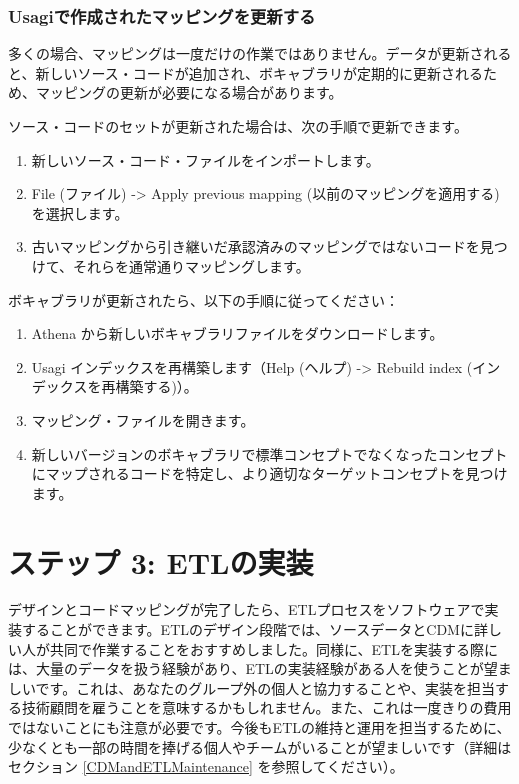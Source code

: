 \documentclass[
  11pt]{book}
\providecommand{\tightlist}{%
  \setlength{\itemsep}{0pt}\setlength{\parskip}{0pt}}
\theoremstyle{definition}
\theoremstyle{definition}
\theoremstyle{definition}
\theoremstyle{definition}
\theoremstyle{remark}
\begin{document}
\subsubsection*{Usagiで作成されたマッピングを更新する}\label{usagiux3067ux4f5cux6210ux3055ux308cux305fux30deux30c3ux30d4ux30f3ux30b0ux3092ux66f4ux65b0ux3059ux308b}

多くの場合、マッピングは一度だけの作業ではありません。データが更新されると、新しいソース・コードが追加され、ボキャブラリが定期的に更新されるため、マッピングの更新が必要になる場合があります。

ソース・コードのセットが更新された場合は、次の手順で更新できます。

\begin{enumerate}
\def\labelenumi{\arabic{enumi}.}
\tightlist
\item
  新しいソース・コード・ファイルをインポートします。
\item
  File (ファイル) -\textgreater{} Apply previous mapping (以前のマッピングを適用する) を選択します。
\item
  古いマッピングから引き継いだ承認済みのマッピングではないコードを見つけて、それらを通常通りマッピングします。
\end{enumerate}

ボキャブラリが更新されたら、以下の手順に従ってください：

\begin{enumerate}
\def\labelenumi{\arabic{enumi}.}
\tightlist
\item
  Athena から新しいボキャブラリファイルをダウンロードします。
\item
  Usagi インデックスを再構築します（Help (ヘルプ) -\textgreater{} Rebuild index (インデックスを再構築する)）。
\item
  マッピング・ファイルを開きます。
\item
  新しいバージョンのボキャブラリで標準コンセプトでなくなったコンセプトにマップされるコードを特定し、より適切なターゲットコンセプトを見つけます。
\end{enumerate}

\section{ステップ 3: ETLの実装}\label{ux30b9ux30c6ux30c3ux30d7-3-etlux306eux5b9fux88c5}

デザインとコードマッピングが完了したら、ETLプロセスをソフトウェアで実装することができます。ETLのデザイン段階では、ソースデータとCDMに詳しい人が共同で作業することをおすすめしました。同様に、ETLを実装する際には、大量のデータを扱う経験があり、ETLの実装経験がある人を使うことが望ましいです。これは、あなたのグループ外の個人と協力することや、実装を担当する技術顧問を雇うことを意味するかもしれません。また、これは一度きりの費用ではないことにも注意が必要です。今後もETLの維持と運用を担当するために、少なくとも一部の時間を捧げる個人やチームがいることが望ましいです（詳細はセクション \ref{CDMandETLMaintenance} を参照してください）。
\end{document}
